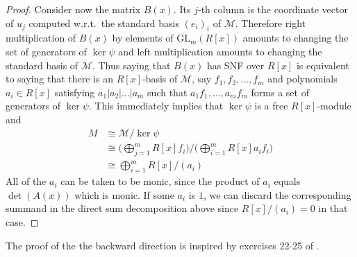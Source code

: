 \documentclass[ALCO, Unicode]{cedram}
\newcommand{\GL}{\mathrm{GL}}
\begin{document}
\begin{proof}
Consider now the matrix $ B(x) $. Its  $ j$-th column is the coordinate vector of $ u_{j} $ computed w.r.t.\  the standard basis $ ( e_{i} )_{i} $ of  $ \mathcal {  M  } $. Therefore right multiplication of $ B(x) $ by elements of $ \GL_{m}(R[x]) $ amounts to changing the set of generators of $ \ker \psi      $    and left multiplication amounts to changing the  standard  basis of $   \mathcal{M} $. Thus saying that $ B(x) $ has SNF over $ R[x] $ is equivalent to saying that there is an $R[x]$-basis of $    \mathcal  {  M   } $, say $ f_{1}, f_{2}, \ldots, f_{m} $   and polynomials $ a_{i} \in R[x]  $ satisfying $ a_{1} | a_{2 }  | \ldots | a_{m}  $ such that $  a_{1} f_{1}, \ldots , a_{m}  f_{m} $ forms a set of generators   of $ \ker \psi $.  This immediately implies that $ \ker \psi $ is a free $R[x] $-module and        
\begin{align*}   M    &  \cong     \mathcal{M }      /  \ker \psi    \\     & \cong  \bigg ( \bigoplus_{j=1}^{m} R[x] f_{i}    \bigg ) \bigg /   \bigg ( \bigoplus_{i=1}^{m} R[x] a_{i} f_{i}  \bigg  )   \\ 
& \cong \bigoplus_{i=1}^{m}  R[x]/ (a_{i})                                                                           
 \end{align*} 
All of the $ a_{i} $ can be taken to be monic, since the product of $ a_{i} $ equals $ \det(A(x)) $ which is monic.  If some $ a_{i} $ is $ 1 $, we can discard  the corresponding summand in the direct sum  decomposition above since  $  R[x] /  (a_{i}) = 0    $ in that case.                                                                                    \end{proof}


\begin{remark} The proof of the the backward direction  is  inspired by exercises 22-25 of \cite[\S 2]{D&F}.   
\end{remark}       
 
\end{document}
